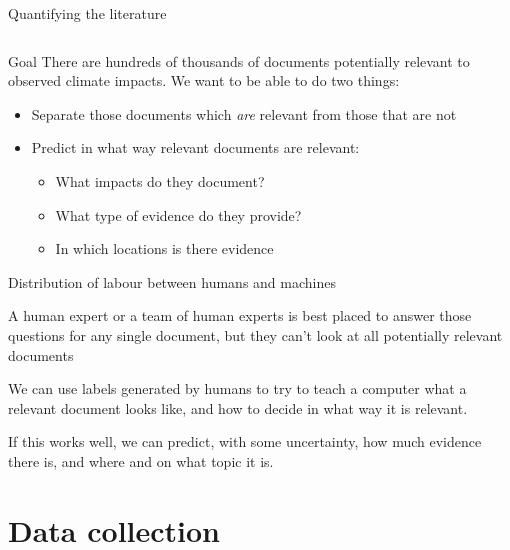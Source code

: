 \documentclass[9pt]{beamer}
\begin{document}
\begin{frame}{Quantifying the literature}
\begin{columns}
\end{columns}

\end{frame}


\begin{frame}{Goal}
There are hundreds of thousands of documents potentially relevant to observed climate impacts. We want to be able to do two things:

\begin{itemize}
	\item<2-> Separate those documents which \textit{are} relevant from those that are not
	\item<3-> Predict in what way relevant documents are relevant:
	\begin{itemize}
		\item What impacts do they document?
		\item What type of evidence do they provide?
		\item In which locations is there evidence
	\end{itemize}
\end{itemize}


\end{frame}



\begin{frame}{Distribution of labour between humans and machines}

A human expert or a team of human experts is best placed to answer those questions for any single document, but they can't look at all potentially relevant documents

\bigskip

We can use labels generated by humans to try to teach a computer what a relevant document looks like, and how to decide in what way it is relevant. 

\bigskip

If this works well, we can predict, with some uncertainty, how much evidence there is, and where and on what topic it is.

\end{frame}


\section{Data collection}
\end{document}
